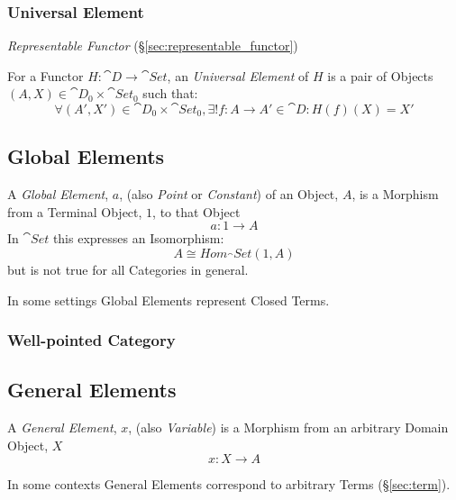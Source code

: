 \subsubsection{Universal Element}\label{sec:universal_element}

\emph{Representable Functor} (\S\ref{sec:representable_functor})

For a Functor $H : \cat{D} \rightarrow \cat{Set}$, an
\emph{Universal Element} of $H$ is a pair of Objects $(A,X) \in
\cat{D}_0 \times \cat{Set}_0$ such that:
\[
  \forall (A',X') \in \cat{D}_0 \times \cat{Set}_0,
  \exists! f : A \rightarrow A' \in \cat{D} : H(f)(X) = X'
\]



\subsection{Global Elements}\label{sec:global_element}

A \emph{Global Element}, $a$, (also \emph{Point} or \emph{Constant})
of an Object, $A$, is a Morphism from a Terminal Object, $1$, to that
Object
\[
  a: 1 \rightarrow A
\]
In $\cat{Set}$ this expresses an Isomorphism:
\[
  A \cong Hom_\cat{Set}(1,A)
\]
but is not true for all Categories in general.

In some settings Global Elements represent Closed Terms.



\subsubsection{Well-pointed Category}\label{sec:well_pointed}



\subsection{General Elements}\label{sec:general_element}

A \emph{General Element}, $x$, (also \emph{Variable}) is a Morphism
from an arbitrary Domain Object, $X$
\[
  x: X \rightarrow A
\]

In some contexts General Elements correspond to arbitrary Terms
(\S\ref{sec:term}).



